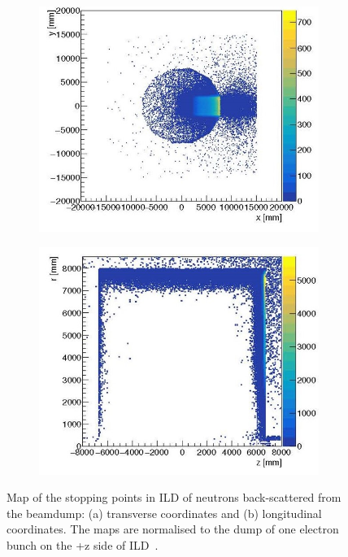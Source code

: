 \begin{figure}[t!]
\centering
\begin{subfigure}{0.40\textwidth}
\includegraphics[width=1.0\hsize]{Integration/fig/BG_neutrons_a.jpg}
\caption{}
\end{subfigure}
\begin{subfigure}{0.48\textwidth}
\includegraphics[width=1.0\hsize]{Integration/fig/BG_neutrons_b.jpg}
\caption{}
\end{subfigure}
\caption{\label{fig:integration:neutrons}Map of the stopping points in ILD of neutrons back-scattered from the beamdump: (a) transverse coordinates and (b) longitudinal coordinates. The maps are normalised to the dump of one electron bunch on the +z side of ILD~\cite{ild:bib:schuetz_thesis}.}
\end{figure}


